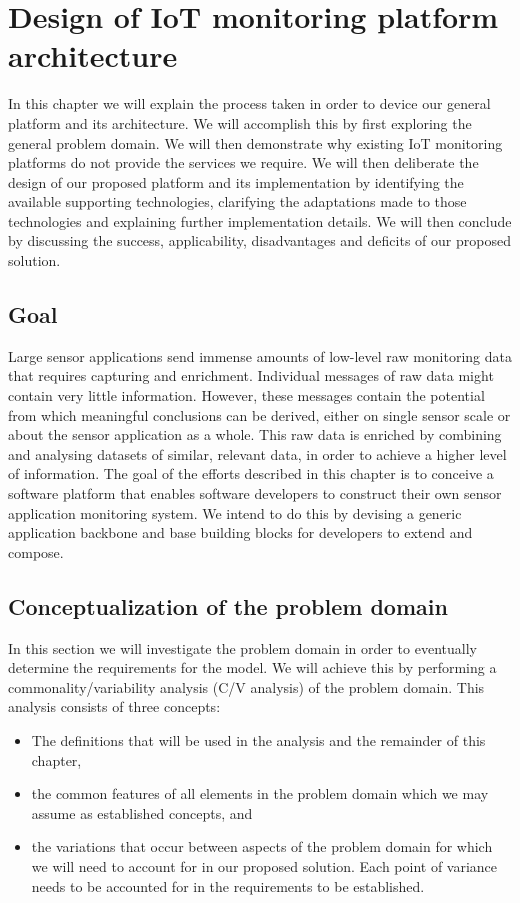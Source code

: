 \newcommand{\archid}{1}
\chapter{Design of IoT monitoring platform architecture}
In this chapter we will explain the process taken in order to device our general platform and its architecture. We will accomplish this by first exploring the general problem domain. We will then demonstrate why existing IoT monitoring platforms do not provide the services we require. We will then deliberate the design of our proposed platform and its implementation by identifying the available supporting technologies, clarifying the adaptations made to those technologies and explaining further implementation details. We will then conclude by discussing the success, applicability, disadvantages and deficits of our proposed solution.
\section{Goal}
Large sensor applications send immense amounts of low-level raw monitoring data that requires capturing and enrichment. Individual messages of raw data might contain very little information. However, these messages contain the potential from which meaningful conclusions can be derived, either on single sensor scale or about the sensor application as a whole. This raw data is enriched by combining and analysing datasets of similar, relevant data, in order to achieve a higher level of information. The goal of the efforts described in this chapter is to conceive a software platform that enables software developers to construct their own sensor application monitoring system. We intend to do this by devising a generic application backbone and base building blocks for  developers to extend and compose.  
\section{Conceptualization of the problem domain}
In this section we will investigate the problem domain in order to eventually determine the requirements for the model. We will achieve this by performing a commonality/variability analysis (C/V analysis) \cite{var_invar} of the problem domain. This analysis consists of three concepts:
\begin{itemize}
\item The definitions that will be used in the analysis and the remainder of this chapter, 
\item the common features of all elements in the problem domain which we may assume as established concepts, and 
\item the variations that occur between aspects of the problem domain for which we will need to account for in our proposed solution. Each point of variance needs to be accounted for in the requirements to be established.
\end{itemize}
